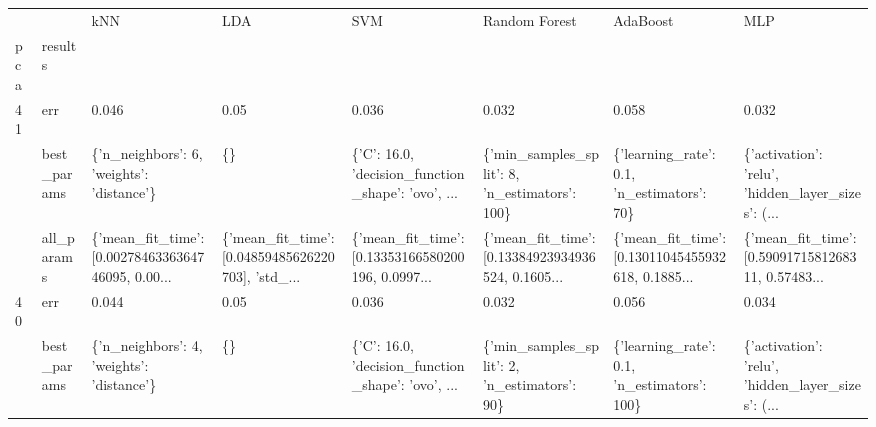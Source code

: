 \begin{tabular}{llllllll}
\toprule
   &            &                                                kNN &                                                LDA &                                                SVM &                                      Random Forest &                                           AdaBoost &                                                MLP \\
pca & results &                                                    &                                                    &                                                    &                                                    &                                                    &                                                    \\
\midrule
41 & err &                                              0.046 &                                               0.05 &                                              0.036 &                                              0.032 &                                              0.058 &                                              0.032 \\
   & best\_params &          \{'n\_neighbors': 6, 'weights': 'distance'\} &                                                 \{\} &  \{'C': 16.0, 'decision\_function\_shape': 'ovo', ... &      \{'min\_samples\_split': 8, 'n\_estimators': 100\} &         \{'learning\_rate': 0.1, 'n\_estimators': 70\} &  \{'activation': 'relu', 'hidden\_layer\_sizes': (... \\
   & all\_params &  \{'mean\_fit\_time': [0.0027846336364746095, 0.00... &  \{'mean\_fit\_time': [0.04859485626220703], 'std\_... &  \{'mean\_fit\_time': [0.13353166580200196, 0.0997... &  \{'mean\_fit\_time': [0.13384923934936524, 0.1605... &  \{'mean\_fit\_time': [0.13011045455932618, 0.1885... &  \{'mean\_fit\_time': [0.5909171581268311, 0.57483... \\
40 & err &                                              0.044 &                                               0.05 &                                              0.036 &                                              0.032 &                                              0.056 &                                              0.034 \\
   & best\_params &          \{'n\_neighbors': 4, 'weights': 'distance'\} &                                                 \{\} &  \{'C': 16.0, 'decision\_function\_shape': 'ovo', ... &       \{'min\_samples\_split': 2, 'n\_estimators': 90\} &        \{'learning\_rate': 0.1, 'n\_estimators': 100\} &  \{'activation': 'relu', 'hidden\_layer\_sizes': (... \\

\end{tabular}
